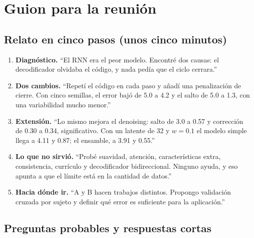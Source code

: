 \documentclass[11pt,a4paper]{article}
\begin{document}
\section{Guion para la reunión}

\subsection{Relato en cinco pasos (unos cinco minutos)}

\begin{enumerate}
\item \textbf{Diagnóstico.} ``El RNN era el peor modelo. Encontré dos causas: el decodificador olvidaba el código, y nada pedía que el ciclo cerrara.''
\item \textbf{Dos cambios.} ``Repetí el código en cada paso y añadí una penalización de cierre. Con cinco semillas, el error bajó de 5.0 a 4.2 y el salto de 5.0 a 1.3, con una variabilidad mucho menor.''
\item \textbf{Extensión.} ``Lo mismo mejora el denoising: salto de 3.0 a 0.57 y corrección de 0.30 a 0.34, significativo. Con un latente de 32 y $w=0.1$ el modelo simple llega a 4.11 y 0.87; el ensamble, a 3.91 y 0.55.''
\item \textbf{Lo que no sirvió.} ``Probé suavidad, atención, características extra, consistencia, currículo y decodificador bidireccional. Ninguno ayuda, y eso apunta a que el límite está en la cantidad de datos.''
\item \textbf{Hacia dónde ir.} ``A y B hacen trabajos distintos. Propongo validación cruzada por sujeto y definir qué error es suficiente para la aplicación.''
\end{enumerate}

\subsection{Preguntas probables y respuestas cortas}
\end{document}
